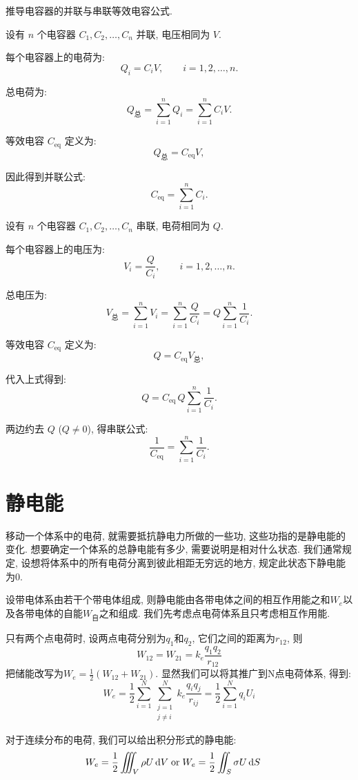 \begin{example}
推导电容器的并联与串联等效电容公式.

设有 $n$ 个电容器 $C_1, C_2, \dots, C_n$ 并联, 电压相同为 $V$.

每个电容器上的电荷为:
\[
Q_i = C_i V,\qquad i=1,2,\dots,n.
\]

总电荷为:
\[
Q_{\text{总}} = \sum_{i=1}^n Q_i = \sum_{i=1}^n C_i V.
\]

等效电容 $C_{\text{eq}}$ 定义为:
\[
Q_{\text{总}} = C_{\text{eq}} V,
\]

因此得到并联公式:
\[
C_{\text{eq}} = \sum_{i=1}^n C_i.
\]

设有 $n$ 个电容器 $C_1, C_2, \dots, C_n$ 串联, 电荷相同为 $Q$.

每个电容器上的电压为:
\[
V_i = \frac{Q}{C_i},\qquad i=1,2,\dots,n.
\]

总电压为:
\[
V_{\text{总}} = \sum_{i=1}^n V_i = \sum_{i=1}^n \frac{Q}{C_i}
= Q \sum_{i=1}^n \frac{1}{C_i}.
\]

等效电容 $C_{\text{eq}}$ 定义为:
\[
Q = C_{\text{eq}} V_{\text{总}},
\]

代入上式得到:
\[
Q = C_{\text{eq}}\, Q \sum_{i=1}^n \frac{1}{C_i}.
\]

两边约去 $Q$ ($Q\neq 0$), 得串联公式:
\[
\frac{1}{C_{\text{eq}}} = \sum_{i=1}^n \frac{1}{C_i}.
\]
\end{example}

\section{静电能}
移动一个体系中的电荷, 就需要抵抗静电力所做的一些功, 这些功指的是静电能的变化. 想要确定一个体系的总静电能有多少, 需要说明是相对什么状态. 我们通常规定, 设想将体系中的所有电荷分离到彼此相距无穷远的地方, 规定此状态下静电能为0.

设带电体系由若干个带电体组成, 则静电能由各带电体之间的相互作用能之和$W_e$以及各带电体的自能$W_{\text{自}}$之和组成. 我们先考虑点电荷体系且只考虑相互作用能.

只有两个点电荷时, 设两点电荷分别为$q_1$和$q_2$, 它们之间的距离为$r_{12}$, 则
\[
W_{12}= W_{21} = k_e \frac{q_1 q_2}{r_{12}}
\]
把储能改写为$W_e=\frac{1}{2}(W_{12}+W_{21})$. 显然我们可以将其推广到N点电荷体系, 得到:
\[
W_e = \frac{1}{2} \sum_{i=1}^N \sum_{\substack{j=1 \\ j\neq i}}^N k_e \frac{q_i q_j}{r_{ij}} = \frac{1}{2} \sum_{i=1}^N q_i U_i
\]

对于连续分布的电荷, 我们可以给出积分形式的静电能:
\[
W_e = \frac{1}{2} \iiint_V \rho U \d V \; \text{or} \; W_e = \frac{1}{2} \iint_S \sigma U \d S    
\]


